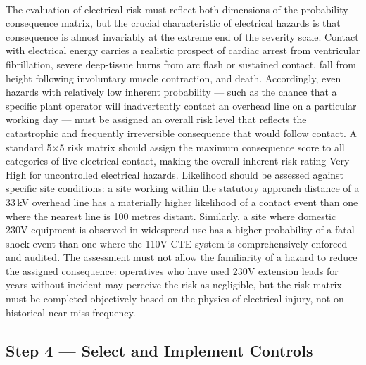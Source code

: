 \paragraph{}
The evaluation of electrical risk must reflect both dimensions of the probability--consequence matrix, but the crucial characteristic of electrical hazards is that consequence is almost invariably at the extreme end of the severity scale. Contact with electrical energy carries a realistic prospect of cardiac arrest from ventricular fibrillation, severe deep-tissue burns from arc flash or sustained contact, fall from height following involuntary muscle contraction, and death. Accordingly, even hazards with relatively low inherent probability --- such as the chance that a specific plant operator will inadvertently contact an overhead line on a particular working day --- must be assigned an overall risk level that reflects the catastrophic and frequently irreversible consequence that would follow contact. A standard 5$\times$5 risk matrix should assign the maximum consequence score to all categories of live electrical contact, making the overall inherent risk rating Very High for uncontrolled electrical hazards. Likelihood should be assessed against specific site conditions: a site working within the statutory approach distance of a 33\,kV overhead line has a materially higher likelihood of a contact event than one where the nearest line is 100 metres distant. Similarly, a site where domestic 230V equipment is observed in widespread use has a higher probability of a fatal shock event than one where the 110V CTE system is comprehensively enforced and audited. The assessment must not allow the familiarity of a hazard to reduce the assigned consequence: operatives who have used 230V extension leads for years without incident may perceive the risk as negligible, but the risk matrix must be completed objectively based on the physics of electrical injury, not on historical near-miss frequency.

\subsection{Step 4 --- Select and Implement Controls}

